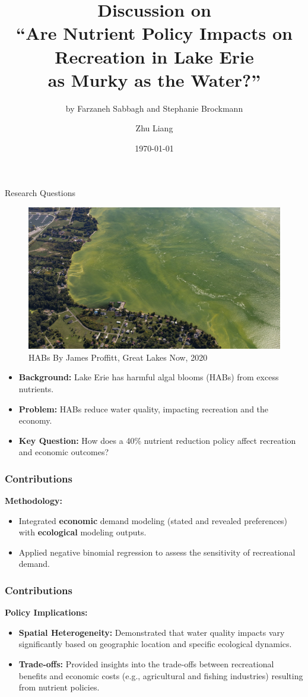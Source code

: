 \documentclass[professionalfonts, aspectratio=169]{beamer}
\title{Discussion on \\ ``Are Nutrient Policy Impacts on Recreation in Lake Erie \\ as Murky as the Water?''}
\institute{Stony Brook University}
\subtitle{by Farzaneh Sabbagh and Stephanie Brockmann}
\author{Zhu Liang}
\date{\today}
\begin{document}
\begin{frame}[plain]
  \titlepage
\end{frame}

\begin{frame}{Research Questions}
  \begin{figure}
    \centering
    \includegraphics[width=0.5\linewidth]{habs.png}
    \caption{HABs By James Proffitt, Great Lakes Now, 2020}
  \end{figure}
  \begin{itemize}
      \item \textbf{Background:} Lake Erie has harmful algal blooms (HABs) from excess nutrients.
      \item \textbf{Problem:} HABs reduce water quality, impacting recreation and the economy.
      \item \textbf{Key Question:} How does a 40\% nutrient reduction policy affect recreation and economic outcomes?
  \end{itemize}
\end{frame}

\begin{frame}
  \frametitle{Contributions}
  \textbf{Methodology:}
  \begin{itemize}
    \item Integrated \textbf{economic} demand modeling (stated and revealed preferences) with \textbf{ecological} modeling outputs.
    \item Applied negative binomial regression to assess the sensitivity of recreational demand.
  \end{itemize}
\end{frame}

\begin{frame}
  \frametitle{Contributions}
  \textbf{Policy Implications:}
  \begin{itemize}
    \item \textbf{Spatial Heterogeneity:} Demonstrated that water quality impacts vary significantly based on geographic location and specific ecological dynamics.
    \item \textbf{Trade-offs:} Provided insights into the trade-offs between recreational benefits and economic costs (e.g., agricultural and fishing industries) resulting from nutrient policies.
  \end{itemize}
\end{frame}
\end{document}
